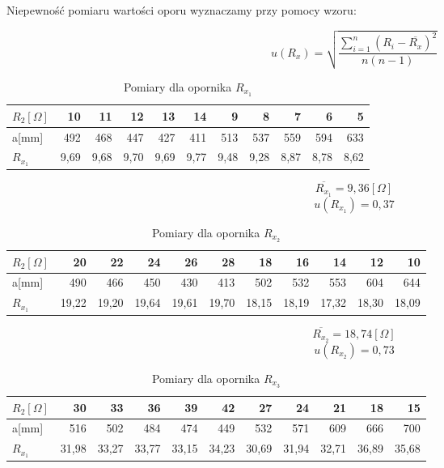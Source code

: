 \documentclass[a4paper,10pt,twoside]{article}
\begin{document}
Niepewność pomiaru wartości oporu wyznaczamy przy pomocy wzoru:

$$ u(R_x) = \sqrt{\frac{\sum^n_{i=1}\left(R_i - \overline{R_x} \right)^2}{n(n-1)}} $$

	\begin{table}
		\centering
		\begin{tabular}{|l|r|r|r|r|r|r|r|r|r|r|}
			\hline
			$R_2[\Omega]$  & 10    & 11   & 12    & 13    & 14   & 9   & 8    & 7     & 6     & 5    \\
			\hline
			a[mm]  & 492   & 468  & 447 & 427   & 411  & 513  & 537  & 559   & 594   & 633   \\
			\hline
			$R_{x_1}$ & 9,69 & 9,68 & 9,70 & 9,69 & 9,77 & 9,48 & 9,28 & 8,87 & 8,78 & 8,62\\
			\hline                      
		\end{tabular}
		\caption{Pomiary dla opornika $R_{x_1}$}
		\label{tab:Rx1}
	\end{table}
$$\overline{R_{x_1}}=9,36 [\Omega]$$
$$u(R_{x_1})=0,37$$
\begin{table}
	\centering
	\begin{tabular}{|l|r|r|r|r|r|r|r|r|r|r|}
		\hline
		$R_2[\Omega]$  & 20    & 22   & 24    & 26    & 28   & 18   & 16    & 14     & 12     & 10   \\
		\hline
		a[mm]  & 490   & 466  & 450 & 430   & 413  & 502  & 532  & 553   & 604   & 644   \\
		\hline
		$R_{x_1}$ & 19,22 & 19,20 & 19,64 & 19,61 & 19,70 & 18,15 & 18,19 & 17,32 & 18,30 & 18,09\\
		\hline                      
	\end{tabular}
	\caption{Pomiary dla opornika $R_{x_2}$}
	\label{tab:Rx1}
\end{table}
$$\overline{R_{x_2}}=18,74 [\Omega]$$
$$u(R_{x_2})=0,73$$
\begin{table}
	\centering
	\begin{tabular}{|l|r|r|r|r|r|r|r|r|r|r|}
		\hline
		$R_2[\Omega]$  & 30    & 33   & 36    & 39    & 42   & 27   & 24    & 21     & 18     & 15   \\
		\hline
		a[mm]  & 516   & 502  & 484 & 474   & 449  & 532  & 571  & 609   & 666   & 700   \\
		\hline
		$R_{x_1}$ & 31,98 & 33,27 & 33,77 & 33,15 & 34,23 & 30,69 & 31,94 & 32,71 & 36,89 & 35,68\\
		\hline                      
	\end{tabular}
	\caption{Pomiary dla opornika $R_{x_3}$}
	\label{tab:Rx1}
\end{table}
\end{document}
